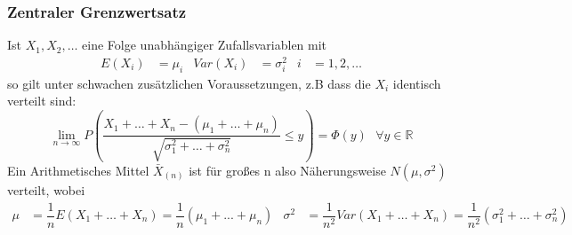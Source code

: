 \documentclass[
	ngerman,
	accentcolor=9c,%
	type=intern,
	marginpar=false
	]{tudapub}
\begin{document}
            \subsubsection{Zentraler Grenzwertsatz}
                \begin{satz}
                    Ist $X_1,X_2,\dots$ eine Folge unabhängiger  Zufallsvariablen mit 
                    \begin{align*}
                        E(X_i) &= \mu_i & Var(X_i) &= \sigma_i^2 & i&= 1,2,\dots
                    \end{align*}
                    so gilt unter schwachen zusätzlichen Voraussetzungen, z.B dass die $X_i$ identisch verteilt sind: 
                    \begin{equation*}
                        \lim_{n\rightarrow \infty} P \left(
                            \dfrac{X_1+\dots+X_n- (\mu_1+\dots+\mu_n)}{\sqrt{\sigma_1^2+\dots+\sigma_n^2}}\leq y
                        \right) = \Phi(y) \mbox{ }\forall y \in \mathbb{R}
                    \end{equation*}
                    Ein Arithmetisches Mittel $\bar{X}_{(n)}$ ist für großes n also Näherungsweise $N(\mu, \sigma^2)$ verteilt, wobei
                    \begin{align*}
                        \mu &= \dfrac{1}{n}E(X_1+\dots+X_n) = \dfrac{1}{n}(\mu_1+...+\mu_n) & \sigma^2 &= \dfrac{1}{n^2} Var(X_1+\dots+X_n)= \dfrac{1}{n^2}(\sigma_1^2+\dots+\sigma_n^2) 
                    \end{align*}
                \end{satz}
                \setcounter{satz}{3}
\end{document}
